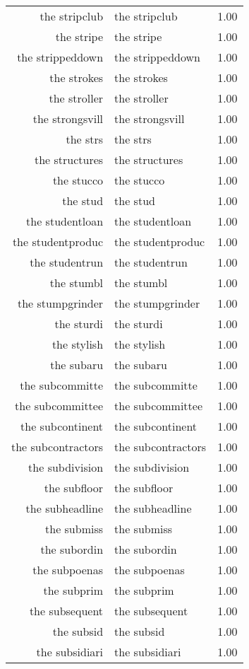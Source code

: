\begin{table}[ht]
\begin{tabular}{rlr}
  the stripclub & the stripclub & 1.00 \\ 
  the stripe & the stripe & 1.00 \\ 
  the strippeddown & the strippeddown & 1.00 \\ 
  the strokes & the strokes & 1.00 \\ 
  the stroller & the stroller & 1.00 \\ 
  the strongsvill & the strongsvill & 1.00 \\ 
  the strs & the strs & 1.00 \\ 
  the structures & the structures & 1.00 \\ 
  the stucco & the stucco & 1.00 \\ 
  the stud & the stud & 1.00 \\ 
  the studentloan & the studentloan & 1.00 \\ 
  the studentproduc & the studentproduc & 1.00 \\ 
  the studentrun & the studentrun & 1.00 \\ 
  the stumbl & the stumbl & 1.00 \\ 
  the stumpgrinder & the stumpgrinder & 1.00 \\ 
  the sturdi & the sturdi & 1.00 \\ 
  the stylish & the stylish & 1.00 \\ 
  the subaru & the subaru & 1.00 \\ 
  the subcommitte & the subcommitte & 1.00 \\ 
  the subcommittee & the subcommittee & 1.00 \\ 
  the subcontinent & the subcontinent & 1.00 \\ 
  the subcontractors & the subcontractors & 1.00 \\ 
  the subdivision & the subdivision & 1.00 \\ 
  the subfloor & the subfloor & 1.00 \\ 
  the subheadline & the subheadline & 1.00 \\ 
  the submiss & the submiss & 1.00 \\ 
  the subordin & the subordin & 1.00 \\ 
  the subpoenas & the subpoenas & 1.00 \\ 
  the subprim & the subprim & 1.00 \\ 
  the subsequent & the subsequent & 1.00 \\ 
  the subsid & the subsid & 1.00 \\ 
  the subsidiari & the subsidiari & 1.00 \\ 

\end{tabular}
\end{table}
